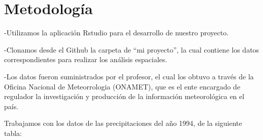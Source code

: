 \documentclass[11pt,]{article}
\newenvironment{Shaded}{\begin{snugshade}}{\end{snugshade}}
\newcommand{\KeywordTok}[1]{\textcolor[rgb]{0.13,0.29,0.53}{\textbf{#1}}}
\newcommand{\StringTok}[1]{\textcolor[rgb]{0.31,0.60,0.02}{#1}}
\newcommand{\OperatorTok}[1]{\textcolor[rgb]{0.81,0.36,0.00}{\textbf{#1}}}
\newcommand{\NormalTok}[1]{#1}
\begin{document}
\section{Metodología}\label{metodologuxeda}

-Utilizamos la aplicación Rstudio para el desarrollo de nuestro
proyecto.

-Clonamos desde el Github la carpeta de ``mi proyecto'', la cual
contiene los datos correspondientes para realizar los análisis
espaciales.

-Los datos fueron suministrados por el profesor, el cual los obtuvo a
través de la Oficina Nacional de Meteorrologia (ONAMET), que es el ente
encargado de regulador la investigación y producción de la información
meteorológica en el país.

Trabajamos con los datos de las precipitaciones del año 1994, de la
siguiente tabla:

\begin{Shaded}
\end{Shaded}
\end{document}
